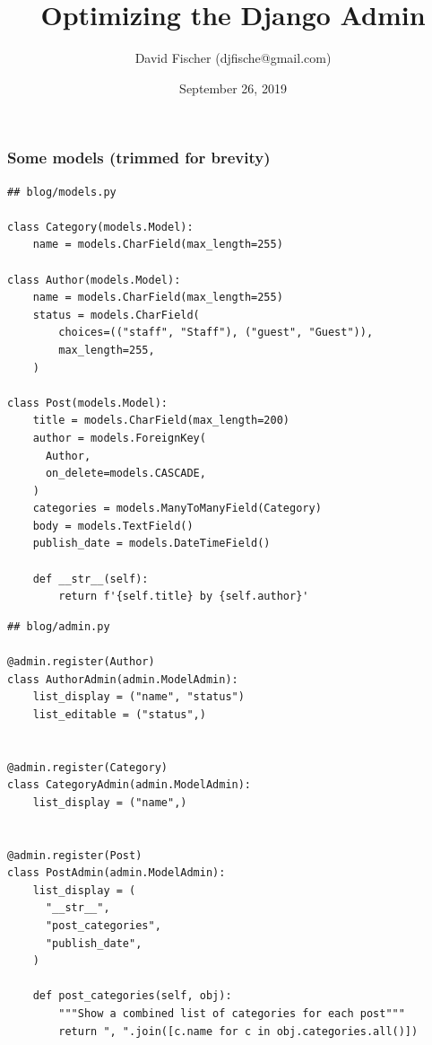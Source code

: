 \documentclass[aspectratio=169]{beamer}
\title{Optimizing the Django Admin}
\author{David Fischer (djfische@gmail.com)}
\date{September 26, 2019}
\begin{document}
\maketitle


\begin{frame}[fragile]
\frametitle{Some models (trimmed for brevity)}

\begin{multicols}{2}

{\tiny
\begin{verbatim}
## blog/models.py

class Category(models.Model):
    name = models.CharField(max_length=255)

class Author(models.Model):
    name = models.CharField(max_length=255)
    status = models.CharField(
        choices=(("staff", "Staff"), ("guest", "Guest")),
        max_length=255,
    )

class Post(models.Model):
    title = models.CharField(max_length=200)
    author = models.ForeignKey(
      Author, 
      on_delete=models.CASCADE,
    )
    categories = models.ManyToManyField(Category)
    body = models.TextField()
    publish_date = models.DateTimeField()

    def __str__(self):
        return f'{self.title} by {self.author}'
\end{verbatim}
} 

\columnbreak

{\tiny
\begin{verbatim}
## blog/admin.py

@admin.register(Author)
class AuthorAdmin(admin.ModelAdmin):
    list_display = ("name", "status")
    list_editable = ("status",)


@admin.register(Category)
class CategoryAdmin(admin.ModelAdmin):
    list_display = ("name",)


@admin.register(Post)
class PostAdmin(admin.ModelAdmin):
    list_display = (
      "__str__",
      "post_categories", 
      "publish_date",
    )

    def post_categories(self, obj):
        """Show a combined list of categories for each post"""
        return ", ".join([c.name for c in obj.categories.all()])
\end{verbatim}
}

\end{multicols}

\end{frame}
\end{document}
